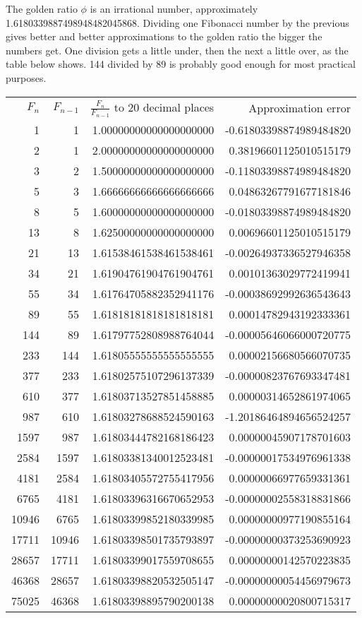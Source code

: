 \documentclass[12pt]{article}
\begin{document}
The golden ratio $\phi$ is an irrational number, approximately 1.6180339887498948482045868. Dividing one Fibonacci number by the previous gives better and better approximations to the golden ratio the bigger the numbers get. One division gets a little under, then the next a little over, as the table below shows. 144 divided by 89 is probably good enough for most practical purposes.

\begin{tabular}{|r|r|r|r|}
$F_n$ & $F_{n - 1}$ & $\frac{F_n}{F_{n - 1}}$ to 20 decimal places & Approximation error \\
1 & 1 & 1.00000000000000000000 & -0.61803398874989484820 \\
2 & 1 & 2.00000000000000000000 & 0.38196601125010515179 \\
3 & 2 & 1.50000000000000000000 & -0.11803398874989484820 \\
5 & 3 & 1.66666666666666666666 & 0.04863267791677181846 \\
8 & 5 & 1.60000000000000000000 & -0.01803398874989484820 \\
13 & 8 & 1.62500000000000000000 & 0.00696601125010515179 \\
21 & 13 & 1.61538461538461538461 & -0.00264937336527946358 \\
34 & 21 & 1.61904761904761904761 & 0.00101363029772419941 \\
55 & 34 & 1.61764705882352941176 & -0.00038692992636543643 \\
89 & 55 & 1.61818181818181818181 & 0.00014782943192333361 \\
144 & 89 & 1.61797752808988764044 & -0.00005646066000720775 \\
233 & 144 & 1.61805555555555555555 & 0.00002156680566070735 \\
377 & 233 & 1.61802575107296137339 & -0.00000823767693347481 \\
610 & 377 & 1.61803713527851458885 & 0.00000314652861974065 \\
987 & 610 & 1.61803278688524590163 & -1.20186464894656524257 \\
1597 & 987 & 1.61803444782168186423 & 0.00000045907178701603 \\
2584 & 1597 & 1.61803381340012523481 & -0.00000017534976961338 \\
4181 & 2584 & 1.61803405572755417956 & 0.00000066977659331361 \\
6765 & 4181 & 1.61803396316670652953 & -0.00000002558318831866 \\
10946 & 6765 & 1.61803399852180339985 & 0.00000000977190855164 \\
17711 & 10946 & 1.61803398501735793897 & -0.00000000373253690923 \\
28657 & 17711 & 1.61803399017559708655 & 0.00000000142570223835 \\
46368 & 28657 & 1.61803398820532505147 & -0.00000000054456979673 \\
75025 & 46368 & 1.61803398895790200138 & 0.00000000020800715317 \\
\end{tabular}
\end{document}

